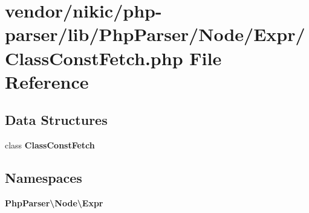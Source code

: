 \section{vendor/nikic/php-\/parser/lib/\+Php\+Parser/\+Node/\+Expr/\+Class\+Const\+Fetch.php File Reference}
\label{_class_const_fetch_8php}
\subsection*{Data Structures}
\begin{DoxyCompactItemize}
\item 
class {\bf Class\+Const\+Fetch}
\end{DoxyCompactItemize}
\subsection*{Namespaces}
\begin{DoxyCompactItemize}
\item 
 {\bf Php\+Parser\textbackslash{}\+Node\textbackslash{}\+Expr}
\end{DoxyCompactItemize}

